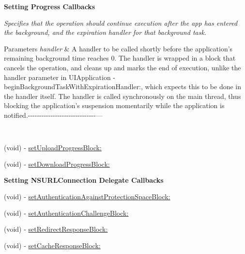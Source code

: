 \begin{Indent}{\bf Setting Progress Callbacks}\par
{\em Specifies that the operation should continue execution after the app has entered the background, and the expiration handler for that background task.


\begin{DoxyParams}{Parameters}
{\em handler} & A handler to be called shortly before the application’s remaining background time reaches 0. The handler is wrapped in a block that cancels the operation, and cleans up and marks the end of execution, unlike the {\ttfamily handler} parameter in {\ttfamily U\-I\-Application -\/begin\-Background\-Task\-With\-Expiration\-Handler\-:}, which expects this to be done in the handler itself. The handler is called synchronously on the main thread, thus blocking the application’s suspension momentarily while the application is notified.-\/-\/-\/-\/-\/-\/-\/-\/-\/-\/-\/-\/-\/-\/-\/-\/-\/-\/-\/-\/-\/-\/-\/-\/-\/-\/-\/-\/-\/-\/--- 

 \\
\hline
\end{DoxyParams}
}\begin{DoxyCompactItemize}
\item 
(void) -\/ \hyperlink{interface_a_f_u_r_l_connection_operation_a8ef860f783f3742b7ee114d0b90bf369}{set\-Upload\-Progress\-Block\-:}
\item 
(void) -\/ \hyperlink{interface_a_f_u_r_l_connection_operation_af6b5bdceaac703f661a872b7c11b9efa}{set\-Download\-Progress\-Block\-:}
\end{DoxyCompactItemize}
\end{Indent}
\begin{Indent}{\bf Setting N\-S\-U\-R\-L\-Connection Delegate Callbacks}\par
{\em 

 

 }\begin{DoxyCompactItemize}
\item 
(void) -\/ \hyperlink{interface_a_f_u_r_l_connection_operation_a91554001cb29dd13b087aa378356b1c6}{set\-Authentication\-Against\-Protection\-Space\-Block\-:}
\item 
(void) -\/ \hyperlink{interface_a_f_u_r_l_connection_operation_a38421e5d1f082c9034662ffa254c5ea2}{set\-Authentication\-Challenge\-Block\-:}
\item 
(void) -\/ \hyperlink{interface_a_f_u_r_l_connection_operation_a6ff7ed6adca2d294e546c381ce6d2648}{set\-Redirect\-Response\-Block\-:}
\item 
(void) -\/ \hyperlink{interface_a_f_u_r_l_connection_operation_af1ec45d46071ee3b69b15e0c64d1ddf8}{set\-Cache\-Response\-Block\-:}
\end{DoxyCompactItemize}
\end{Indent}
